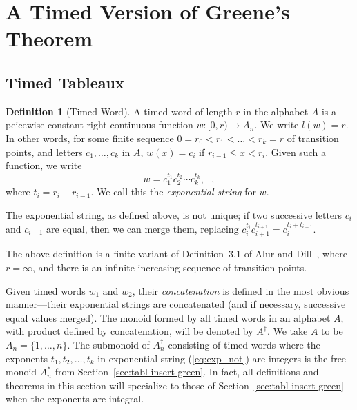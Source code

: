 \documentclass[12pt]{amsart}
\theoremstyle{definition}
\newtheorem{definition}[theorem]{Definition}
\begin{document}
\section{A Timed Version of Greene's Theorem}
\label{sec:timed-vers-green}
\subsection{Timed Tableaux}
\label{sec:timed-tableaux}
\begin{definition}
  [Timed Word]
  \label{definition:timed-word}
  A timed word of length $r$ in the alphabet $A$ is a peicewise-constant right-continuous function $w:[0,r)\to A_n$.
  We write $l(w)=r$.
  In other words, for some finite sequence $0=r_0<r_1<\dotsc<r_k=r$ of transition points, and letters $c_1,\dotsc, c_k$ in $A$, $w(x) = c_i$ if $r_{i-1}\leq x < r_i$.
  Given such a function, we write
  \begin{equation}
    \label{eq:exp_not}
    w = c_1^{t_1} c_2^{t_2}\dotsb c_k^{t_k}, \text{ },
  \end{equation}
  where $t_i = r_i-r_{i-1}$.
  We call this the \emph{exponential string} for $w$.
\end{definition}
The exponential string, as defined above, is not unique; if two successive letters $c_i$ and $c_{i+1}$ are equal, then we can merge them, replacing $c_i^{t_i}c_{i+1}^{t_{i+1}} = c_i^{t_i+t_{i+1}}$.

The above definition is a finite variant of Definition~3.1 of Alur and Dill~\cite{alur-dill}, where $r=\infty$, and there is an infinite increasing sequence of transition points.

Given timed words $w_1$ and $w_2$, their \emph{concatenation} is defined in the most obvious manner---their exponential strings are concatenated (and if necessary, successive equal values merged).
The monoid formed by all timed words in an alphabet $A$, with product defined by concatenation, will be denoted by $A^\dagger$.
We take $A$ to be $A_n=\{1,\dotsc,n\}$.
The submonoid of $A_n^\dagger$ consisting of timed words where the exponents $t_1,t_2,\dotsc,t_k$ in exponential string (\ref{eq:exp_not}) are integers is the free monoid $A_n^*$ from Section~\ref{sec:tabl-insert-green}.
In fact, all definitions and theorems in this section will specialize to those of Section~\ref{sec:tabl-insert-green} when the exponents are integral.
\end{document}

